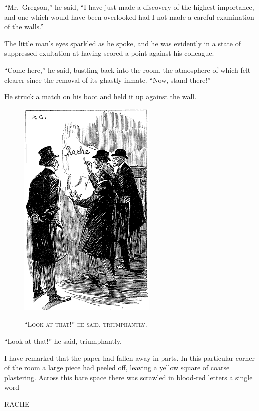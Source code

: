 \documentclass[12pt,english]{book}
\newcommand{\noun}[1]{\textsc{#1}}
\begin{document}
{}``Mr.\ Gregson,'' he said, {}``I have just made a discovery
of the highest importance, and one which would have been overlooked
had I not made a careful examination of the walls.''

The little man's eyes sparkled as he spoke, and he was evidently in
a state of suppressed exultation at having scored a point against
his colleague.

{}``Come here,'' he said, bustling back into the room, the atmosphere
of which felt clearer since the removal of its ghastly inmate. {}``Now,
stand there!''

He struck a match on his boot and held it up against the wall.

%
\begin{figure}[htbp]
\noindent \begin{center}\includegraphics{images/study10-stud-06.png}\end{center}

\noindent \begin{center}\noun{{}``Look at that!'' he said, triumphantly.}\end{center}
\end{figure}
{}``Look at that!'' he said, triumphantly.

I have remarked that the paper had fallen away in parts. In this particular
corner of the room a large piece had peeled off, leaving a yellow
square of coarse plastering. Across this bare space there was scrawled
in blood-red letters a single word---

\noindent \begin{center}RACHE\end{center}
\end{document}

